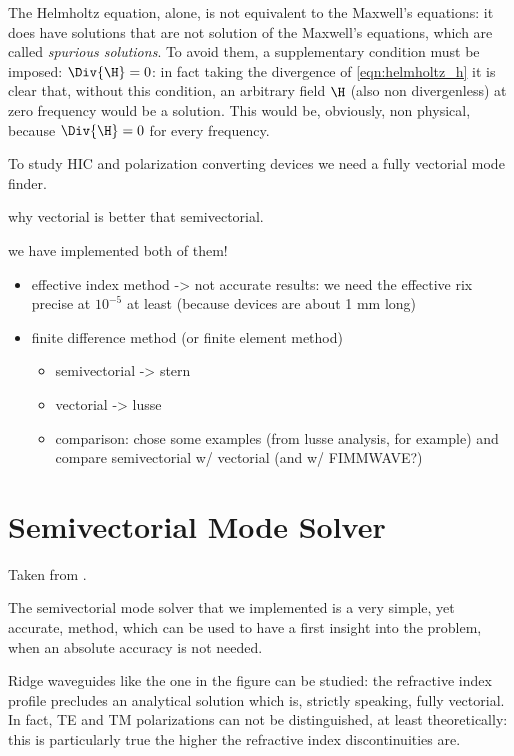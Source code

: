 The Helmholtz equation, alone, is not equivalent to the Maxwell's
equations: it does have solutions that are not solution of the
Maxwell's equations, which are called \emph{spurious solutions}. To
avoid them, a supplementary condition must be imposed: $\Div{\H} = 0$:
in fact taking the divergence of \eqref{eqn:helmholtz_h} it is clear that,
without this condition, an arbitrary field $\H$ (also non
divergenless) at zero frequency would be a solution. This would be,
obviously, non physical, because $\Div{\H} = 0$ for every frequency.

To study HIC and polarization converting devices we need a fully
vectorial mode finder.

why vectorial is better that semivectorial.

we have implemented both of them!

\begin{itemize}
\item
  effective index method -> not accurate results: we need the
  effective rix precise at $10^{-5}$ at least (because devices are about
  1 mm long)
\item
  finite difference method (or finite element method)
  \begin{itemize}
  \item
    semivectorial -> stern
  \item
    vectorial -> lusse
  \item
    comparison: chose some examples (from lusse analysis, for example)
    and compare semivectorial w/ vectorial (and w/ FIMMWAVE?)
  \end{itemize}
\end{itemize}

\section{Semivectorial Mode Solver}

Taken from \cite{stern_semivectorial}.

The semivectorial mode solver that we implemented is a very simple,
yet accurate, method, which can be used to have a first insight into
the problem, when an absolute accuracy is not needed.

Ridge waveguides like the one in the figure can be studied: the
refractive index profile precludes an analytical solution which is,
strictly speaking, fully vectorial. In fact, TE and TM polarizations
can not be distinguished, at least theoretically: this is particularly
true the higher the refractive index discontinuities are.

